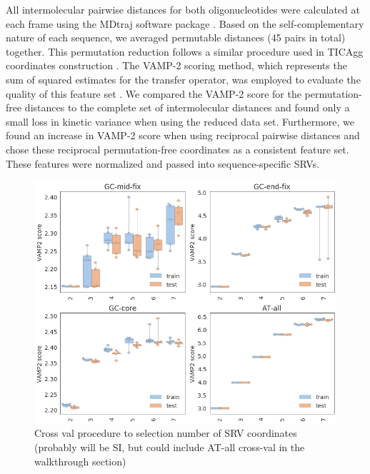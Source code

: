 \documentclass[journal=jpcbfk,manuscript=article]{achemso}
\begin{document}
All intermolecular pairwise distances for both oligonucleotides were calculated at each frame using the MDtraj software package \citep{McGibbon2015MDTraj:Trajectories}. Based on the self-complementary nature of each sequence, we averaged permutable distances (45 pairs in total) together. This permutation reduction follows a similar procedure used in TICAgg coordinates construction \citep{Sengupta2019AutomatedSelf-assembly}. The VAMP-2 scoring method, which represents the sum of squared estimates for the transfer operator, was employed to evaluate the quality of this feature set \citep{Mardt2018VAMPnetsKinetics}. We compared the VAMP-2 score for the permutation-free distances to the complete set of intermolecular distances and found only a small loss in kinetic variance when using the reduced data set. Furthermore, we found an increase in VAMP-2 score when using reciprocal pairwise distances and chose these reciprocal permutation-free coordinates as a consistent feature set. These features were normalized and passed into sequence-specific SRVs. 

\begin{figure}[ht!]
	\begin{center}
        \includegraphics[width=\textwidth]{Figs/figs_0804/srv_crossval.png}
        \caption{Cross val procedure to selection number of SRV coordinates (probably will be SI, but could include AT-all cross-val in the walkthrough section)}
        \label{fig:srv_crossval}
	\end{center}
\end{figure}
\end{document}

